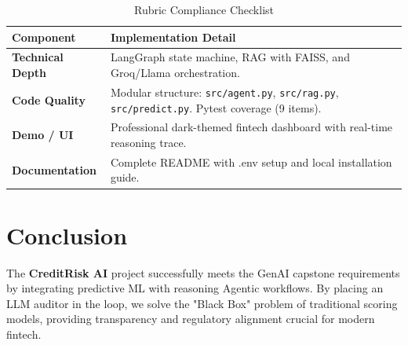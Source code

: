 \documentclass[12pt,a4paper]{article}
\newcommand{\code}[1]{\texttt{#1}}
\begin{document}
\begin{table}[H]
  \centering
  \caption{Rubric Compliance Checklist}
  \begin{tabularx}{\linewidth}{lX}
    \toprule
    \textbf{Component} & \textbf{Implementation Detail} \\
    \midrule
    \textbf{Technical Depth} & LangGraph state machine, RAG with FAISS, and Groq/Llama orchestration. \\
    \textbf{Code Quality}    & Modular structure: \code{src/agent.py}, \code{src/rag.py}, \code{src/predict.py}. Pytest coverage (9 items). \\
    \textbf{Demo / UI}       & Professional dark-themed fintech dashboard with real-time reasoning trace. \\
    \textbf{Documentation}   & Complete README with .env setup and local installation guide. \\
    \bottomrule
  \end{tabularx}
\end{table}

\section{Conclusion}

The \textbf{CreditRisk AI} project successfully meets the GenAI capstone requirements
by integrating predictive ML with reasoning Agentic workflows. By placing an LLM
auditor in the loop, we solve the "Black Box" problem of traditional scoring models,
providing transparency and regulatory alignment crucial for modern fintech.
\end{document}
